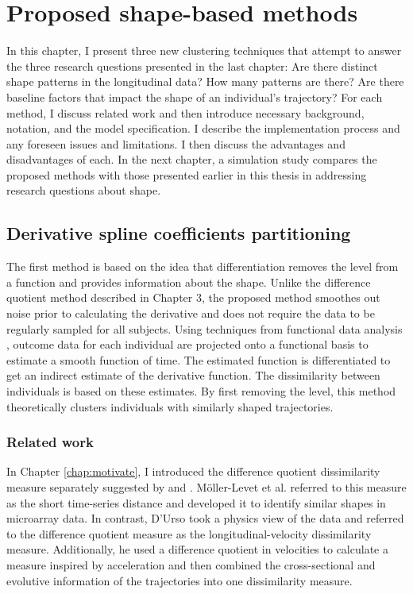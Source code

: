 \chapter{Proposed shape-based methods}
\label{chap:methods}
In this chapter, I present three new clustering techniques that attempt to answer the three research questions presented in the last chapter: Are there distinct shape patterns in the longitudinal data? How many patterns are there? Are there baseline factors that impact the shape of an individual's trajectory? For each method, I discuss related work and then introduce necessary background, notation, and the model specification. I describe the implementation process and any foreseen issues and limitations. I then discuss the advantages and disadvantages of each. In the next chapter, a simulation study compares the proposed methods with those presented earlier in this thesis in addressing research questions about shape.

\section{Derivative spline coefficients partitioning}
The first method is based on the idea that differentiation removes the level from a function and provides information about the shape. Unlike the difference quotient method described in Chapter 3,  the proposed method smoothes out noise prior to calculating the derivative and does not require the data to be regularly sampled for all subjects. Using techniques from functional data analysis \cite{ramsay2002}, outcome data for each individual are projected onto a functional basis to estimate a smooth function of time. The estimated function is differentiated to get an indirect estimate of the derivative function. The dissimilarity between individuals is based on these estimates. By first removing the level, this  method theoretically clusters individuals with similarly shaped trajectories.

\subsection{Related work}
In Chapter \ref{chap:motivate}, I introduced the difference quotient dissimilarity measure separately suggested by \textcite{d2000} and \textcite{moller2003}. M{\"o}ller-Levet et al. referred to this measure as the short time-series distance and developed it to identify similar shapes in microarray data. In contrast, D'Urso took a physics view of the data and referred to the difference quotient measure as the longitudinal-velocity dissimilarity measure. Additionally, he used a difference quotient in velocities to calculate a measure inspired by acceleration and then combined the cross-sectional and evolutive information of the trajectories into one dissimilarity measure.

